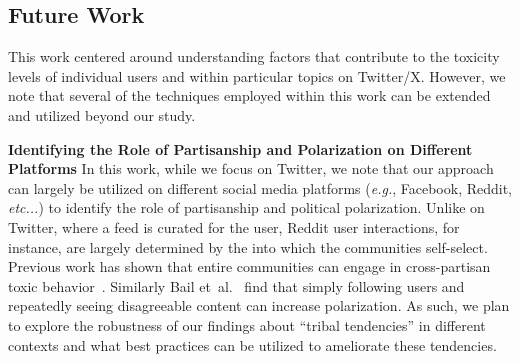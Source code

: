\subsection{Future Work}
This work centered around understanding factors that contribute to the toxicity levels of individual users and within particular topics on Twitter/X. However, we note that several of the techniques employed within this work can be extended and utilized beyond our study.


\vspace{2pt}
\noindent
\textbf{Identifying the Role of Partisanship and Polarization on Different Platforms} In this work, while we focus on Twitter, we note that our approach can largely be utilized on different social media platforms (\textit{e.g.}, Facebook, Reddit, \textit{etc...}) to identify the role of partisanship and political polarization. Unlike on Twitter, where a feed is curated for the user, Reddit user interactions, for instance, are largely determined by the into which the communities self-select. Previous work has shown that entire communities can engage in cross-partisan toxic behavior~\cite{efstratiou2022non}. Similarly Bail et~al.~\cite{bail2018exposure} find that simply following users and repeatedly seeing disagreeable content can increase polarization. As such, we plan to explore the robustness of our findings about ``tribal tendencies'' in different contexts and what best practices can be utilized to ameliorate these tendencies. 










